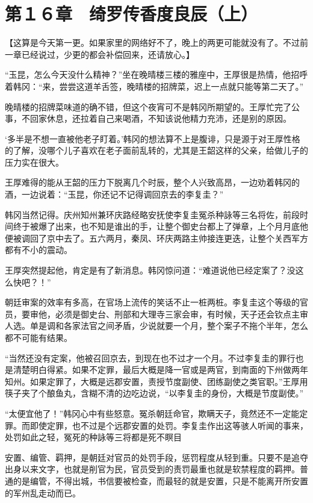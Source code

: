 \section{第１６章　绮罗传香度良辰（上）  }

【这算是今天第一更。如果家里的网络好不了，晚上的两更可能就没有了。不过前一章已经说过，少更的都会补偿回来，还请放心。】

“玉昆，怎么今天没什么精神？”坐在晚晴楼三楼的雅座中，王厚很是热情，他招呼着韩冈：“来，尝尝这道羊舌签，晚晴楼的招牌菜，迟上一点就只能等第二天了。”

晚晴楼的招牌菜味道的确不错，但这个夜宵可不是韩冈所期望的。王厚忙完了公事，不回家休息，还拉着自己来喝酒，不知该说他精力充沛，还是别的原因。

‘多半是不想一直被他老子盯着。’韩冈的想法算不上是腹诽，只是源于对王厚性格的了解，没哪个儿子喜欢在老子面前乱转的，尤其是王韶这样的父亲，给做儿子的压力实在很大。

王厚难得的能从王韶的压力下脱离几个时辰，整个人兴致高昂，一边劝着韩冈的酒，一边说着：“玉昆，你还记不记得调回京去的李复圭？”

韩冈当然记得。庆州知州兼环庆路经略安抚使李复圭冤杀种詠等三名将佐，前段时间终于被爆了出来，也不知是谁出的手，让整个御史台都上了弹章，上个月月底他便被调回了京中去了。五六两月，秦凤、环庆两路主帅接连更迭，让整个关西军方都有不小的震动。

王厚突然提起他，肯定是有了新消息。韩冈惊问道：“难道说他已经定案了？没这么快吧？！”

朝廷审案的效率有多高，在官场上流传的笑话不止一桩两桩。李复圭这个等级的官员，要审他，必须是御史台、刑部和大理寺三家会审，有时候，天子还会钦点主审人选。单是调和各家法官之间矛盾，少说就要一个月，整个案子不拖个半年，怎么都不可能有结果。

“当然还没有定案，他被召回京去，到现在也不过才一个月。不过李复圭的罪行也是清楚明白得紧。如果不定罪，最后大概是降一官或是两官，到南面的下州做两年知州。如果定罪了，大概是远郡安置，责授节度副使、团练副使之类官职。”王厚用筷子夹了个酿鱼丸，含糊不清的边吃边说，“以李复圭的身份，大概是节度副使。”

“太便宜他了！”韩冈心中有些怒意。冤杀朝廷命官，欺瞒天子，竟然还不一定能定罪。而即使定罪，也不过是个远郡安置的处罚。李复圭作出这等骇人听闻的事来，处罚如此之轻，冤死的种詠等三将都是死不瞑目

安置、编管、羁押，是朝廷对官员的处罚手段，惩罚程度从轻到重。只要不是追夺出身以来文字，也就是削官为民，官员受到的责罚最重也就是软禁程度的羁押。普通的是编管，不得出城，书信要被检查，而最轻的就是安置，只是不能离开所安置的军州乱走动而已。

